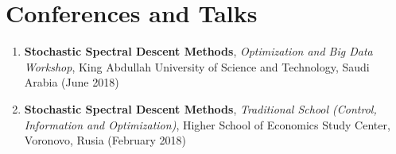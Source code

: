 \section{Conferences and Talks}
\begin{enumerate}
\item {\bf Stochastic Spectral Descent Methods}, {\em Optimization and Big Data Workshop}, King Abdullah University of Science and Technology, Saudi Arabia (June 2018)
\item {\bf Stochastic Spectral Descent Methods}, {\em Traditional School (Control, Information and Optimization)}, Higher School of Economics Study Center, Voronovo, Rusia (February 2018)
\end{enumerate}

